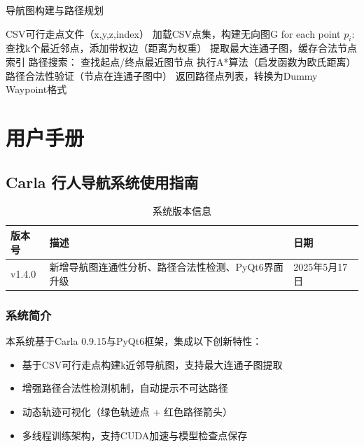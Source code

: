 \begin{algorithm}[H]
\caption{导航图构建与路径规划}
\begin{algorithmic}[1]
\REQUIRE CSV可行走点文件（x,y,z,index）
\STATE 加载CSV点集，构建无向图G
\STATE for each point $p_i$:
    \STATE \quad 查找k个最近邻点，添加带权边（距离为权重）
\STATE 提取最大连通子图，缓存合法节点索引
\STATE 路径搜索：
    \STATE \quad 查找起点/终点最近图节点
    \STATE \quad 执行A*算法（启发函数为欧氏距离）
    \STATE \quad 路径合法性验证（节点在连通子图中）
\STATE 返回路径点列表，转换为Dummy Waypoint格式
\end{algorithmic}
\end{algorithm}


\chapter{用户手册}

\section{Carla 行人导航系统使用指南}

\begin{table}[H]
\centering
\renewcommand{\arraystretch}{1.3}
\begin{tabular}{
  >{\centering\arraybackslash}p{3cm}
  >{\centering\arraybackslash}p{8cm}
  >{\centering\arraybackslash}p{4cm}
}
\toprule
\textbf{版本号} & \textbf{描述} & \textbf{日期} \\
\midrule
v1.4.0 & 新增导航图连通性分析、路径合法性检测、PyQt6界面升级 & 2025年5月17日 \\
\bottomrule
\end{tabular}
\caption{系统版本信息}
\label{tab:version-info}
\end{table}

\subsection{系统简介}
本系统基于Carla 0.9.15与PyQt6框架，集成以下创新特性：
\begin{itemize}
\item 基于CSV可行走点构建k近邻导航图，支持最大连通子图提取
\item 增强路径合法性检测机制，自动提示不可达路径
\item 动态轨迹可视化（绿色轨迹点 + 红色路径箭头）
\item 多线程训练架构，支持CUDA加速与模型检查点保存
\end{itemize}

